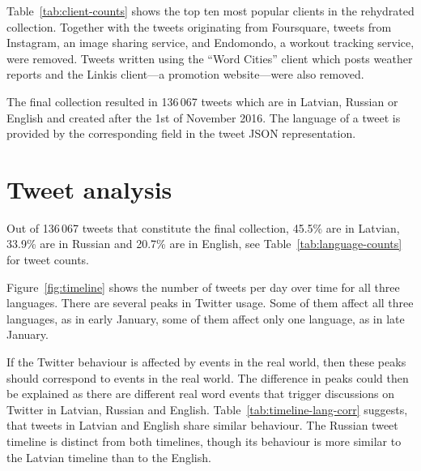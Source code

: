 \documentclass[11pt,a4paper]{article}
\begin{document}


Table~\ref{tab:client-counts} shows the top ten most popular clients in the rehydrated collection. Together with the tweets originating from Foursquare, tweets from Instagram, %
an image sharing service, and Endomondo, %
a workout tracking service, were removed. Tweets written using the ``Word Cities'' client which posts weather reports and the Linkis client---a promotion website---were also removed.

The final collection resulted in 136\,067 tweets which are in Latvian, Russian or English and created after the 1st of November 2016. The language of a tweet is provided by the corresponding field in the tweet JSON representation.

\section{Tweet analysis}
\label{sec:timeline}



Out of 136\,067 tweets that constitute the final collection, 45.5\% are in Latvian, 33.9\% are in Russian and 20.7\% are in English, see Table~\ref{tab:language-counts} for tweet counts.



Figure~\ref{fig:timeline} shows the number of tweets per day over time for all three languages. There are several peaks in Twitter usage. Some of them affect all three languages, as in early January, some of them affect only one language, as in late January.

If the Twitter behaviour is affected by events in the real world, then these peaks should correspond to events in the real world. The difference in peaks could then be explained as there are different real word events that trigger discussions on Twitter in Latvian, Russian and English. Table~\ref{tab:timeline-lang-corr} suggests, that tweets in Latvian and English share similar behaviour. The Russian tweet timeline is distinct from both timelines, though its behaviour is more similar to the Latvian timeline than to the English.
\end{document}
